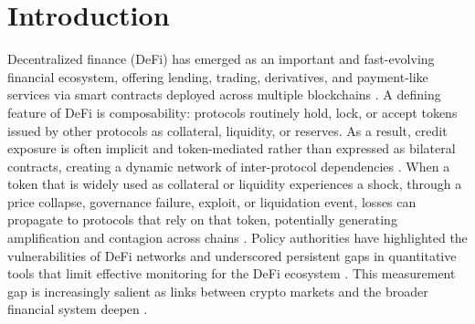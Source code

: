 \section{Introduction}


Decentralized finance (DeFi) has emerged as an important and fast-evolving financial ecosystem, offering lending, trading, derivatives, and payment-like services via smart contracts deployed across multiple blockchains \cite{Schar2021DeFi,gogol2024sokdecentralizedfinancedefi}. A defining feature of DeFi is composability: protocols routinely hold, lock, or accept tokens issued by other protocols as collateral, liquidity, or reserves. As a result, credit exposure is often implicit and token-mediated rather than expressed as bilateral contracts, creating a dynamic network of inter-protocol dependencies \cite{wu2025dexposuredatasetbenchmarksinterprotocol,BERTOMEU2024105321}. When a token that is widely used as collateral or liquidity experiences a shock, through a price collapse, governance failure, exploit, or liquidation event, losses can propagate to protocols that rely on that token, potentially generating amplification and contagion across chains \cite{gogol2024sokdecentralizedfinancedefi,aufiero2025mappingmicroscopicsystemicrisks}. 
Policy authorities have highlighted the vulnerabilities of DeFi networks %
and underscored persistent gaps in quantitative tools that limit effective monitoring for the DeFi ecosystem \citep{BIS2025TVL}. This measurement gap is increasingly salient as links between crypto markets and the broader financial system deepen \cite{ESRB2025}.

